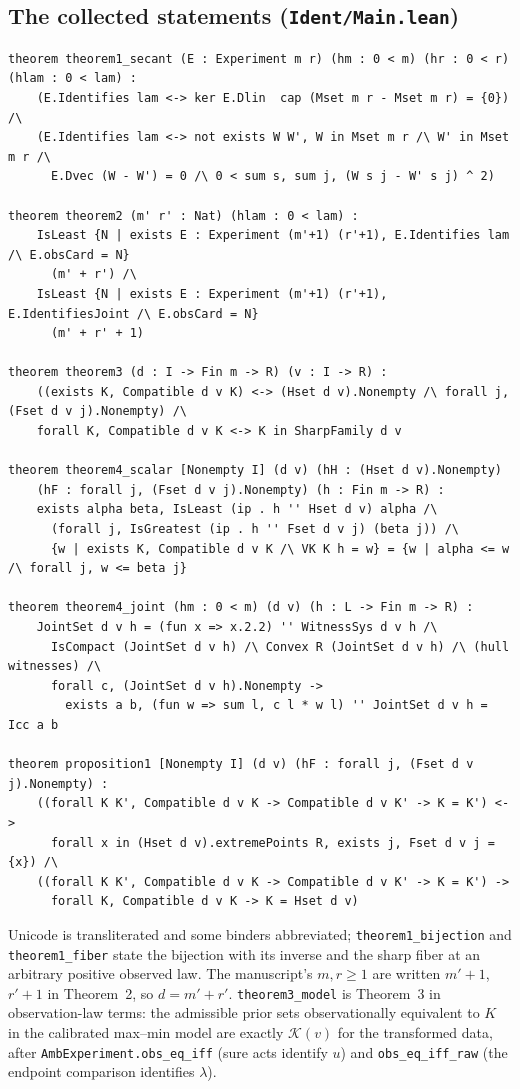 \documentclass[11pt]{article}
\begin{document}
\subsection*{The collected statements (\texttt{Ident/Main.lean})}
\begin{verbatim}
theorem theorem1_secant (E : Experiment m r) (hm : 0 < m) (hr : 0 < r) (hlam : 0 < lam) :
    (E.Identifies lam <-> ker E.Dlin  cap (Mset m r - Mset m r) = {0}) /\
    (E.Identifies lam <-> not exists W W', W in Mset m r /\ W' in Mset m r /\
      E.Dvec (W - W') = 0 /\ 0 < sum s, sum j, (W s j - W' s j) ^ 2)

theorem theorem2 (m' r' : Nat) (hlam : 0 < lam) :
    IsLeast {N | exists E : Experiment (m'+1) (r'+1), E.Identifies lam /\ E.obsCard = N}
      (m' + r') /\
    IsLeast {N | exists E : Experiment (m'+1) (r'+1), E.IdentifiesJoint /\ E.obsCard = N}
      (m' + r' + 1)

theorem theorem3 (d : I -> Fin m -> R) (v : I -> R) :
    ((exists K, Compatible d v K) <-> (Hset d v).Nonempty /\ forall j, (Fset d v j).Nonempty) /\
    forall K, Compatible d v K <-> K in SharpFamily d v

theorem theorem4_scalar [Nonempty I] (d v) (hH : (Hset d v).Nonempty)
    (hF : forall j, (Fset d v j).Nonempty) (h : Fin m -> R) :
    exists alpha beta, IsLeast (ip . h '' Hset d v) alpha /\
      (forall j, IsGreatest (ip . h '' Fset d v j) (beta j)) /\
      {w | exists K, Compatible d v K /\ VK K h = w} = {w | alpha <= w /\ forall j, w <= beta j}

theorem theorem4_joint (hm : 0 < m) (d v) (h : L -> Fin m -> R) :
    JointSet d v h = (fun x => x.2.2) '' WitnessSys d v h /\
      IsCompact (JointSet d v h) /\ Convex R (JointSet d v h) /\ (hull witnesses) /\
      forall c, (JointSet d v h).Nonempty ->
        exists a b, (fun w => sum l, c l * w l) '' JointSet d v h = Icc a b

theorem proposition1 [Nonempty I] (d v) (hF : forall j, (Fset d v j).Nonempty) :
    ((forall K K', Compatible d v K -> Compatible d v K' -> K = K') <->
      forall x in (Hset d v).extremePoints R, exists j, Fset d v j = {x}) /\
    ((forall K K', Compatible d v K -> Compatible d v K' -> K = K') ->
      forall K, Compatible d v K -> K = Hset d v)
\end{verbatim}
Unicode is transliterated and some binders abbreviated; \texttt{theorem1\_bijection} and \texttt{theorem1\_fiber} state the bijection with its inverse and the sharp fiber at an arbitrary positive observed law. The manuscript's $m,r\ge1$ are written $m'+1$, $r'+1$ in Theorem~2, so $d=m'+r'$. \texttt{theorem3\_model} is Theorem~3 in observation-law terms: the admissible prior sets observationally equivalent to $K$ in the calibrated max--min model are exactly $\mathcal K(v)$ for the transformed data, after \texttt{AmbExperiment.obs\_eq\_iff} (sure acts identify $u$) and \texttt{obs\_eq\_iff\_raw} (the endpoint comparison identifies $\lambda$).
\end{document}
